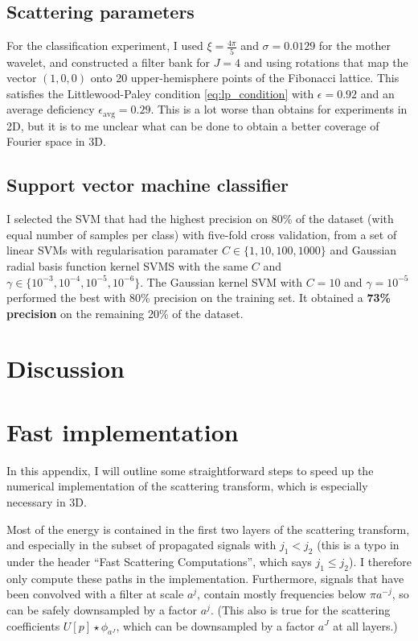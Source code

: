 \documentclass[twocolumn, openany, oneside, article]{memoir}
\begin{document}
\section{Scattering parameters}

For the classification experiment, I used $\xi = \frac{4\pi}{5}$ and $\sigma =
0.0129$ for the mother wavelet, and constructed a filter bank for $J = 4$ and
using rotations that map the vector $(1, 0, 0)$ onto 20 upper-hemisphere points
of the Fibonacci lattice. This satisfies the Littlewood-Paley condition
\autoref{eq:lp_condition} with $\epsilon = 0.92$ and an average deficiency
$\epsilon_{\mathrm{avg}} = 0.29$. This is a lot worse than \cite{bruna2013scattering}
obtains for experiments in 2D, but it is to me unclear what can be done to obtain a better coverage
of Fourier space in 3D.

\section{Support vector machine classifier}

I selected the SVM that had the highest precision on 80\% of the dataset (with
equal number of samples per class) with five-fold cross validation, from a set of linear SVMs with
regularisation paramater $C \in \{1, 10, 100, 1000\}$ and Gaussian radial basis function kernel SVMS with
the same $C$ and $\gamma \in \{ 10^{-3}, 10^{-4}, 10^{-5}, 10^{-6} \}$. The Gaussian kernel SVM with $C = 10$ and $\gamma = 10^{-5}$
performed the best with 80\% precision on the training set. It obtained a \textbf{73\% precision} on the remaining 20\% of the dataset.

\chapter{Discussion}


\appendix

\chapter{Fast implementation}

In this appendix, I will outline some straightforward steps to speed up the
numerical implementation of the scattering transform, which is especially
necessary in 3D.

Most of the energy is contained in the first two layers of the scattering
transform, and especially in the subset of propagated signals with $j_1 < j_2$
\cite{bruna2013invariant, mallat2012group} (this is a typo in \cite{bruna2013}
under the header \enquote{Fast Scattering Computations}, which says $j_1 \leq
j_2$). I therefore only compute these paths in the implementation.
Furthermore, signals that have been convolved with a filter at scale $a^j$,
contain mostly frequencies below $\pi a^{-j}$, so can be safely downsampled by a factor $a^j$.
(This also is true for the scattering coefficients $U[p] \star \phi_{a^J}$, which can be downsampled by a factor
$a^J$ at all layers.)
\end{document}
